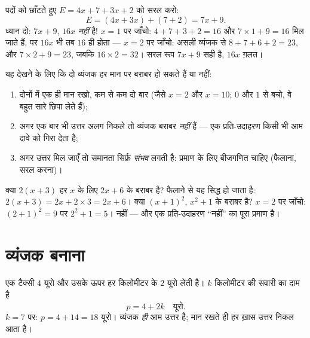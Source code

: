 \begin{example}\label{ex:g7:literal:reduce}
पदों को छाँटते हुए $E = 4x + 7 + 3x + 2$ को सरल करो:
\[
E = (4x + 3x) + (7 + 2) = 7x + 9 .
\]
ध्यान दो: $7x + 9$, $16x$ \emph{नहीं} है! $x = 1$ पर जाँचो:
$4 + 7 + 3 + 2 = 16$ और $7 \times 1 + 9 = 16$ मिल जाते हैं, पर
$16x$ भी तब $16$ ही होता --- $x = 2$ पर जाँचो: असली व्यंजक से
$8 + 7 + 6 + 2 = 23$, और $7 \times 2 + 9 = 23$, जबकि
$16 \times 2 = 32$। सरल रूप $7x + 9$ सही है, $16x$ ग़लत।
\end{example}

\begin{method}[किसी समानता की जाँच]\label{met:g7:literal:test}
यह देखने के लिए कि दो व्यंजक हर मान पर बराबर हो सकते हैं या नहीं:
\begin{enumerate}
  \item दोनों में एक ही मान रखो, कम से कम दो बार (जैसे $x = 2$ और
        $x = 10$; $0$ और $1$ से बचो, वे बहुत सारे  छिपा लेते
        हैं);
  \item अगर एक बार भी उत्तर अलग निकले तो व्यंजक बराबर \emph{नहीं}
        हैं --- एक प्रति-उदाहरण किसी भी आम दावे को गिरा देता है;
  \item अगर उत्तर मिल जाएँ तो समानता सिर्फ़ \emph{संभव} लगती है:
        प्रमाण के लिए बीजगणित चाहिए (फैलाना, सरल करना)।
\end{enumerate}
\end{method}

\begin{example}\label{ex:g7:literal:test}
क्या $2(x + 3)$ हर $x$ के लिए $2x + 6$ के बराबर है? फैलाने से यह
सिद्ध हो जाता है: $2(x+3) = 2x + 2 \times 3 = 2x + 6$। क्या
$(x + 1)^2$, $x^2 + 1$ के बराबर है? $x = 2$ पर जाँचो:
$(2+1)^2 = 9$ पर $2^2 + 1 = 5$। नहीं --- और एक प्रति-उदाहरण
``नहीं'' का पूरा प्रमाण है।
\end{example}

\section{व्यंजक बनाना}

\begin{example}[स्थिति से व्यंजक तक]\label{ex:g7:literal:produce}
एक टैक्सी $4$ यूरो और उसके ऊपर हर किलोमीटर के $2$ यूरो लेती है।
$k$ किलोमीटर की सवारी का दाम है
\[
p = 4 + 2k \quad\text{यूरो}.
\]
$k = 7$ पर: $p = 4 + 14 = 18$ यूरो। व्यंजक \emph{ही} आम उत्तर है;
मान रखते ही हर ख़ास उत्तर निकल आता है।
\end{example}

